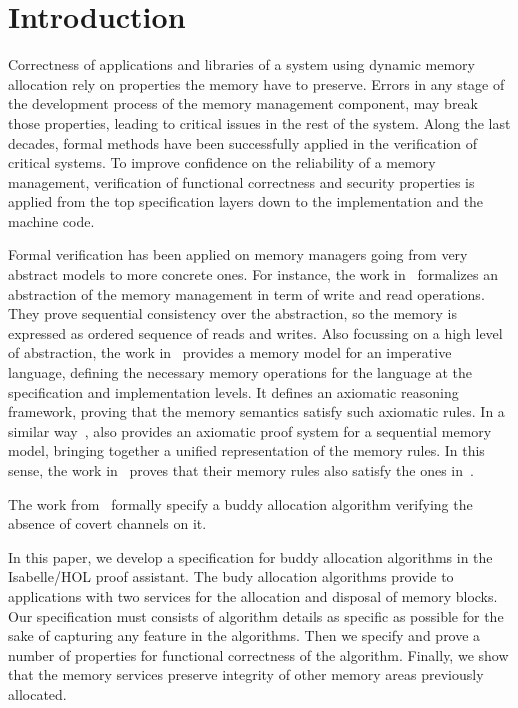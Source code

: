 \documentclass[runningheads]{llncs}
\begin{document}
\section{Introduction}
Correctness of applications and libraries of a system using dynamic memory allocation rely on properties the memory have to preserve. Errors in any stage of the development process of the memory management component, may break those properties, leading to critical issues in the rest of the system. Along the last decades, formal methods have been successfully applied in the verification of critical systems. To improve confidence on the reliability of a memory management, verification of functional correctness and security properties is applied from the top specification layers down to the implementation and the machine code. 

Formal verification has been applied on memory managers going from very abstract models to more concrete ones. For instance, the work in~\cite{reg_higham} formalizes an abstraction of the memory management in term of write and read operations. They prove sequential consistency over the abstraction, so the memory is expressed as ordered sequence of reads and writes. Also focussing on a high level of abstraction, the work in~\cite{reg_blazy} provides a memory model for an imperative language, defining the necessary memory operations for the language at the specification and implementation levels. It defines an axiomatic reasoning framework, proving that the memory semantics satisfy such axiomatic rules. In a similar way~\cite{reg_mansky}, also provides an axiomatic proof system for a sequential memory model, bringing together a unified representation of the memory rules. In this sense, the work in~\cite{reg_mansky} proves that their memory rules also satisfy the ones in~\cite{reg_blazy}.


The work from~\cite{reg_peter} formally specify a buddy allocation algorithm verifying the absence of covert channels on it.


In this paper, we develop a specification for buddy allocation algorithms in the Isabelle/HOL proof assistant. The budy allocation algorithms provide to applications with two services for the allocation and disposal of memory blocks. Our specification must consists of algorithm details as specific as possible for the sake of capturing any feature in the algorithms. Then we specify and prove a number of properties for functional correctness of the algorithm. Finally, we show that the memory services preserve integrity of other memory areas previously allocated.
\end{document}
